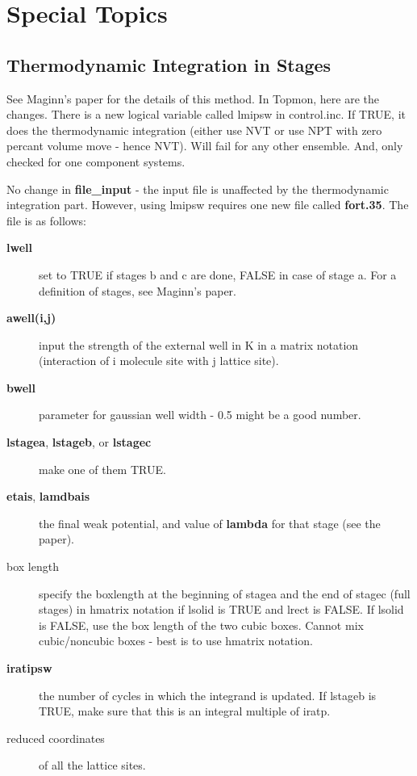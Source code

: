 \documentclass[12pt,letterpaper]{article}
\begin{document}
\section{Special Topics}
\subsection{Thermodynamic Integration in Stages}
See Maginn's paper for the details of this method. In
Topmon, here are the changes. There is a new logical
variable called lmipsw in control.inc. If TRUE, it does the
thermodynamic integration (either use NVT or use NPT with
zero percant volume move - hence NVT). Will fail for any
other ensemble. And, only checked for one component systems.

No change in {\bf file\_input} - the input file is
unaffected by the thermodynamic integration part. However,
using lmipsw requires one new file called {\bf fort.35}. The
file is as follows:
\begin{description}
\item[{\bf lwell}] set to TRUE if stages b and c are done,
  FALSE in case of stage a. For a definition of stages, see
  Maginn's paper.
\item[{\bf awell(i,j)}] input the strength of the external
  well in K in a matrix notation (interaction of i molecule
  site with j lattice site).
\item[{\bf bwell}] parameter for gaussian well width - 0.5
  might be a good number.
\item[{\bf lstagea}, {\bf lstageb}, or {\bf lstagec}] make
  one of them TRUE.
\item[{\bf etais}, {\bf lamdbais}] the final weak potential,
  and value of {\bf lambda} for that stage (see the
  paper).
\item[box length] specify the boxlength at the beginning of
  stagea and the end of stagec (full stages) in hmatrix
  notation if lsolid is TRUE and lrect is FALSE. If lsolid
  is FALSE, use the box length of the two cubic boxes.
  Cannot mix cubic/noncubic boxes - best is to use hmatrix
  notation.
\item[{\bf iratipsw}] the number of cycles in which the
  integrand is updated. If lstageb is TRUE, make sure that
  this is an integral multiple of iratp.
\item[reduced coordinates] of all the lattice sites.
\end{description}
\end{document}
